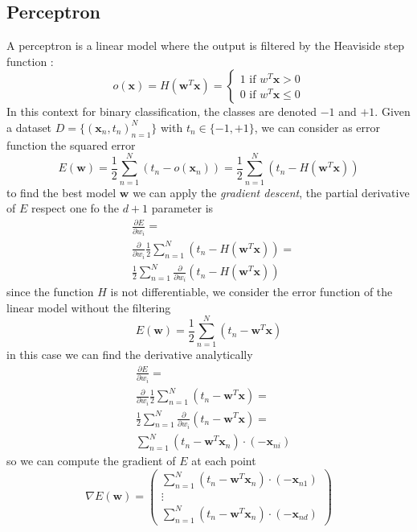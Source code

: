\documentclass[10pt, letterpaper]{report}
\begin{document}
\subsection{Perceptron}
A perceptron is a linear model where the output is filtered by the Heaviside step function :\begin{equation}
	o(\mathbf x)=H(\mathbf w^T\mathbf x)=\begin{cases}
		1 \text{ if }w^T\mathbf x>0 \\
		0 \text{ if }w^T\mathbf x\le 0
	\end{cases}
\end{equation}
In this context for binary classification, the classes are denoted $-1$ and $+1$.
Given a dataset $D=\{(\mathbf x_n,t_n)_{n=1}^N\}$ with $t_n\in\{-1,+1\}$, we can consider as error function the squared error\begin{equation}
	E(\mathbf w)=\frac{1}{2}\sum_{n=1}^N(t_n-o(\mathbf x_n))=\frac{1}{2}\sum_{n=1}^N(t_n-H(\mathbf w^T\mathbf x))
\end{equation}
to find the best model $\mathbf w$ we can apply the \textit{gradient descent}, the partial derivative of $E$ respect one fo the $d+1$ parameter is\begin{align}
	 & \frac{\partial E}{\partial w_i}=                                                  \\&\frac{\partial}{\partial w_i}\frac{1}{2}\sum_{n=1}^N(t_n-H(\mathbf w^T\mathbf x))=\\
	 & \frac{1}{2}\sum_{n=1}^N\frac{\partial}{\partial w_i}(t_n-H(\mathbf w^T\mathbf x))
\end{align}
since the function $H$ is not differentiable, we consider the error function of the linear model without the filtering\begin{equation}
	E(\mathbf w)=\frac{1}{2}\sum_{n=1}^N(t_n-\mathbf w^T\mathbf x)
\end{equation}
in this case we can find the derivative analytically\begin{align}
	 & \frac{\partial E}{\partial w_i}=                                                \\&\frac{\partial}{\partial w_i}\frac{1}{2}\sum_{n=1}^N(t_n-\mathbf w^T\mathbf x)=\\
	 & \frac{1}{2}\sum_{n=1}^N\frac{\partial}{\partial w_i}(t_n-\mathbf w^T\mathbf x)= \\
	 & \sum_{n=1}^N(t_n-\mathbf w^T\mathbf x_n)\cdot (-\mathbf x_{ni})
\end{align}
so we can compute the gradient of $E$ at each point\begin{equation}
	\nabla E(\mathbf w)=\begin{pmatrix}
		\sum_{n=1}^N(t_n-\mathbf w^T\mathbf x_n)\cdot (-\mathbf x_{n1}) \\
		\vdots                                                          \\
		\sum_{n=1}^N(t_n-\mathbf w^T\mathbf x_n)\cdot (-\mathbf x_{nd})
	\end{pmatrix}
\end{equation}
\end{document}
